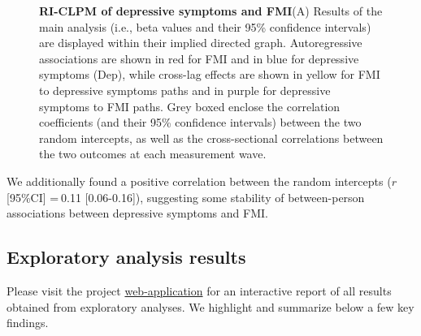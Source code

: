 \documentclass[
  letterpaper,
  DIV=11,
  numbers=noendperiod]{scrreport}
\begin{document}
\begin{figure}[H]


\caption{\label{fig-6.2}\textbf{RI-CLPM of depressive symptoms and
FMI}\newline(A) Results of the main analysis (i.e., beta values and
their 95\% confidence intervals) are displayed within their implied
directed graph. Autoregressive associations are shown in red for FMI and
in blue for depressive symptoms (Dep), while cross-lag effects are shown
in yellow for FMI to depressive symptoms paths and in purple for
depressive symptoms to FMI paths. Grey boxed enclose the correlation
coefficients (and their 95\% confidence intervals) between the two
random intercepts, as well as the cross-sectional correlations between
the two outcomes at each measurement wave.}

\end{figure}%

We additionally found a positive correlation between the random
intercepts (\(r\) {[}95\%CI{]} = 0.11 {[}0.06-0.16{]}), suggesting some
stability of between-person associations between depressive symptoms and
FMI.

\subsection{Exploratory analysis
results}\label{exploratory-analysis-results}

Please visit the project
\href{https://longit-comorbidity.onrender.com}{web-application} for an
interactive report of all results obtained from exploratory analyses. We
highlight and summarize below a few key findings.
\end{document}
